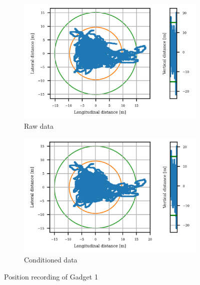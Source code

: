 \documentclass{article}
\begin{document}
			\begin{figure}[h]
		   		\centering
		     	\begin{subfigure}[b]{0.45\textwidth}
		      		\centering
		      	  	\includegraphics[width=\textwidth]{Static/raw_static_U-blox M8N.png}
		      	  	\caption{Raw data}
		     	\end{subfigure}
		     	\begin{subfigure}[b]{0.45\textwidth}
		      	   \centering
		      	   \includegraphics[width=\textwidth]{Static/cond_static_U-blox M8N.png}
		      	   \caption{Conditioned data}
		     	\end{subfigure}
		     	
		      \caption{Position recording of Gadget 1}
		      \label{fig:static_loc_gadget1}
			\end{figure}		
\end{document}
